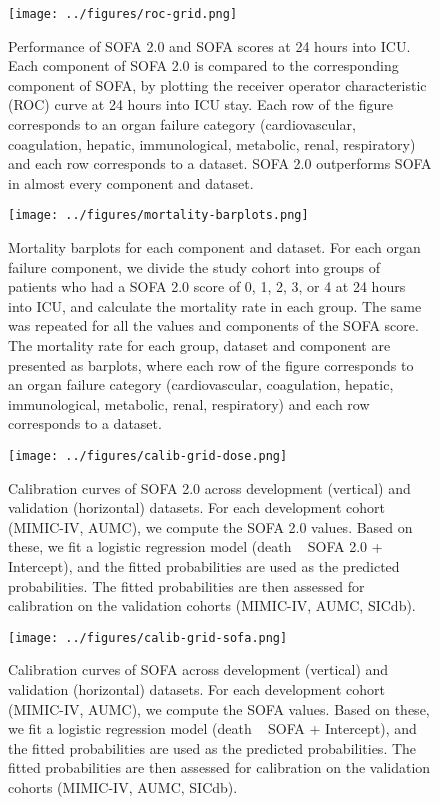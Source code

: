 \documentclass[
]{article}
\begin{document}
\begin{figure}
    \centering
    \texttt{[image: ../figures/roc-grid.png]}
    \caption{Performance of SOFA 2.0 and SOFA scores at 24 hours into ICU. Each component of SOFA 2.0 is compared to the corresponding component of SOFA, by plotting the receiver operator characteristic (ROC) curve at 24 hours into ICU stay. Each row of the figure corresponds to an organ failure category (cardiovascular, coagulation, hepatic, immunological, metabolic, renal, respiratory) and each row corresponds to a dataset. SOFA 2.0 outperforms SOFA in almost every component and dataset.}
\end{figure}

\begin{figure}
    \centering
    \texttt{[image: ../figures/mortality-barplots.png]}
    \caption{Mortality barplots for each component and dataset. For each organ failure component, we divide the study cohort into groups of patients who had a SOFA 2.0 score of 0, 1, 2, 3, or 4 at 24 hours into ICU, and calculate the mortality rate in each group. The same was repeated for all the values and components of the SOFA score. The mortality rate for each group, dataset and component are presented as barplots, where each row of the figure corresponds to an organ failure category (cardiovascular, coagulation, hepatic, immunological, metabolic, renal, respiratory) and each row corresponds to a dataset.}
\end{figure}

\begin{figure}
    \centering
    \texttt{[image: ../figures/calib-grid-dose.png]}
    \caption{Calibration curves of SOFA 2.0 across development (vertical) and validation (horizontal) datasets. For each development cohort (MIMIC-IV, AUMC), we compute the SOFA 2.0 values. Based on these, we fit a logistic regression model (death ~ SOFA 2.0 + Intercept), and the fitted probabilities are used as the predicted probabilities. The fitted probabilities are then assessed for calibration on the validation cohorts (MIMIC-IV, AUMC, SICdb).}
\end{figure}

\begin{figure}
    \centering
    \texttt{[image: ../figures/calib-grid-sofa.png]}
    \caption{Calibration curves of SOFA across development (vertical) and validation (horizontal) datasets. For each development cohort (MIMIC-IV, AUMC), we compute the SOFA values. Based on these, we fit a logistic regression model (death ~ SOFA + Intercept), and the fitted probabilities are used as the predicted probabilities. The fitted probabilities are then assessed for calibration on the validation cohorts (MIMIC-IV, AUMC, SICdb).}
\end{figure}
\end{document}
